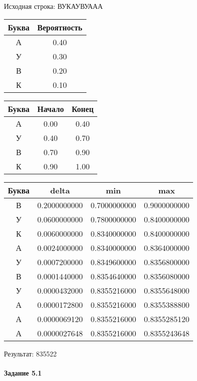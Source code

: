 \documentclass[a4paper, 12pt]{article}
\begin{document}
Исходная строка: ВУКАУВУААА\
\begin{center}
 \begin{tabular}{ |c|c| } 
  \hline
     Буква & Вероятность \\ \hline
А & 0.40\\\hline
У & 0.30\\\hline
В & 0.20\\\hline
К & 0.10
\\ \hline \end{tabular}
\end{center}
\begin{center}
 \begin{tabular}{ |c|c|c| } 
  \hline
     Буква & Начало & Конец \\ \hline
А & 0.00 & 0.40\\\hline
У & 0.40 & 0.70\\\hline
В & 0.70 & 0.90\\\hline
К & 0.90 & 1.00
\\ \hline \end{tabular}
\end{center}
\begin{center}
 \begin{tabular}{ |c|c|c|c| } 
  \hline
     Буква & delta & min & max \\ \hline
В & 0.2000000000 & 0.7000000000 & 0.9000000000\\\hline
У & 0.0600000000 & 0.7800000000 & 0.8400000000\\\hline
К & 0.0060000000 & 0.8340000000 & 0.8400000000\\\hline
А & 0.0024000000 & 0.8340000000 & 0.8364000000\\\hline
У & 0.0007200000 & 0.8349600000 & 0.8356800000\\\hline
В & 0.0001440000 & 0.8354640000 & 0.8356080000\\\hline
У & 0.0000432000 & 0.8355216000 & 0.8355648000\\\hline
А & 0.0000172800 & 0.8355216000 & 0.8355388800\\\hline
А & 0.0000069120 & 0.8355216000 & 0.8355285120\\\hline
А & 0.0000027648 & 0.8355216000 & 0.8355243648
\\ \hline \end{tabular}
\end{center}
Результат: 835522
\pagebreak
\paragraph{Задание 5.1 \\
}
\end{document}
